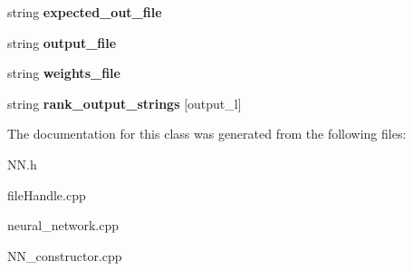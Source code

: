 \begin{DoxyCompactItemize}
\item 
\hypertarget{classNeural__Network_a7fc61ee2ad0ea852fc91aca6baa196c4}{string {\bfseries expected\-\_\-out\-\_\-file}}\label{classNeural__Network_a7fc61ee2ad0ea852fc91aca6baa196c4}

\item 
\hypertarget{classNeural__Network_aa5f1247357af06d58346ff09852b3c69}{string {\bfseries output\-\_\-file}}\label{classNeural__Network_aa5f1247357af06d58346ff09852b3c69}

\item 
\hypertarget{classNeural__Network_a34ef4c88e3b4885a3d53a8b0f9f4495c}{string {\bfseries weights\-\_\-file}}\label{classNeural__Network_a34ef4c88e3b4885a3d53a8b0f9f4495c}

\item 
\hypertarget{classNeural__Network_a61a8573c18e7c8201996a2265c99cd9f}{string {\bfseries rank\-\_\-output\-\_\-strings} \mbox{[}output\-\_\-l\mbox{]}}\label{classNeural__Network_a61a8573c18e7c8201996a2265c99cd9f}

\end{DoxyCompactItemize}


The documentation for this class was generated from the following files\-:\begin{DoxyCompactItemize}
\item 
N\-N.\-h\item 
file\-Handle.\-cpp\item 
neural\-\_\-network.\-cpp\item 
N\-N\-\_\-constructor.\-cpp\end{DoxyCompactItemize}
